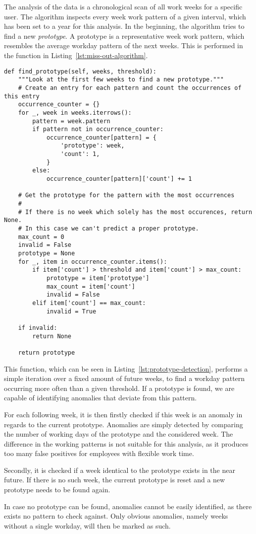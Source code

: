 The analysis of the data is a chronological scan of all work weeks for a specific user.
The algorithm inspects every week work pattern of a given interval, which has been set to a year for this analysis.
In the beginning, the algorithm tries to find a new \emph{prototype}.
A prototype is a representative week work pattern, which resembles the average workday pattern of the next weeks.
This is performed in the function  in Listing~\ref{lst:miss-out-algorithm}.


\begin{verbatim}
def find_prototype(self, weeks, threshold):
    """Look at the first few weeks to find a new prototype."""
    # Create an entry for each pattern and count the occurrences of this entry
    occurrence_counter = {}
    for _, week in weeks.iterrows():
        pattern = week.pattern
        if pattern not in occurrence_counter:
            occurrence_counter[pattern] = {
                'prototype': week,
                'count': 1,
            }
        else:
            occurrence_counter[pattern]['count'] += 1

    # Get the prototype for the pattern with the most occurrences
    #
    # If there is no week which solely has the most occurences, return None.
    # In this case we can't predict a proper prototype.
    max_count = 0
    invalid = False
    prototype = None
    for _, item in occurrence_counter.items():
        if item['count'] > threshold and item['count'] > max_count:
            prototype = item['prototype']
            max_count = item['count']
            invalid = False
        elif item['count'] == max_count:
            invalid = True

    if invalid:
        return None

    return prototype
\end{verbatim}
\begingroup
{}\label{lst:prototype-detection}
\endgroup

This function, which can be seen in Listing~\ref{lst:prototype-detection}, performs a simple iteration over a fixed amount of future weeks, to find a workday pattern occurring more often than a given threshold.
If a prototype is found, we are capable of identifying anomalies that deviate from this pattern.

For each following week, it is then firstly checked if this week is an anomaly in regards to the current prototype.
Anomalies are simply detected by comparing the number of working days of the prototype and the considered week.
The difference in the working patterns is not suitable for this analysis, as it produces too many false positives for employees with flexible work time.

Secondly, it is checked if a week identical to the prototype exists in the near future.
If there is no such week, the current prototype is reset and a new prototype needs to be found again.

In case no prototype can be found, anomalies cannot be easily identified, as there exists no pattern to check against.
Only obvious anomalies, namely weeks without a single workday, will then be marked as such.
